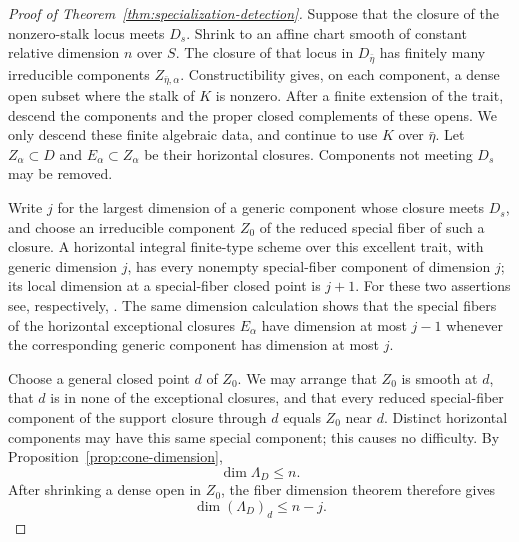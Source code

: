 \begin{proof}[Proof of Theorem~\ref{thm:specialization-detection}]
Suppose that the closure of the nonzero-stalk locus meets $D_s$.
Shrink to an affine chart smooth of constant relative dimension $n$ over
$S$.  The
closure of that locus in $D_{\bar\eta}$ has finitely many irreducible
components $Z_{\bar\eta,\alpha}$.  Constructibility gives, on each
component, a dense open subset where the stalk of $K$ is nonzero.
After a finite extension of the trait, descend the components and the
proper closed complements of these opens.  We only descend these finite
algebraic data, and continue to use $K$ over $\bar\eta$.
Let $Z_\alpha\subset D$ and $E_\alpha\subset Z_\alpha$ be their
horizontal closures.  Components not meeting $D_s$ may be removed.

Write $j$ for the largest dimension of a generic component whose
closure meets $D_s$, and choose an irreducible component $Z_0$ of the
reduced special fiber of such a closure.  A horizontal integral
finite-type scheme over this excellent trait, with generic dimension
$j$, has every nonempty special-fiber component of dimension $j$;
its local dimension at a special-fiber closed point is $j+1$.
For these two assertions see, respectively,
\cite[Tags 0B2J and 02JU]{Stacks}.  The same dimension calculation
shows that the special fibers of the horizontal exceptional closures
$E_\alpha$ have dimension at most $j-1$ whenever the corresponding
generic component has dimension at most $j$.

Choose a general closed point $d$ of $Z_0$.  We may arrange that $Z_0$
is smooth at $d$, that $d$ is in none of the exceptional closures,
and that every reduced special-fiber component of the support closure
through $d$ equals $Z_0$ near $d$.  Distinct horizontal components may
have this same special component; this causes no difficulty.  By
Proposition~\ref{prop:cone-dimension},
\[
                  \dim\Lambda_D\leq n.
\]
After shrinking a dense open in $Z_0$, the fiber dimension theorem
therefore gives
\begin{equation}\label{eq:detection-cone-fiber}
                    \dim(\Lambda_D)_d\leq n-j.
\end{equation}


\end{proof}
